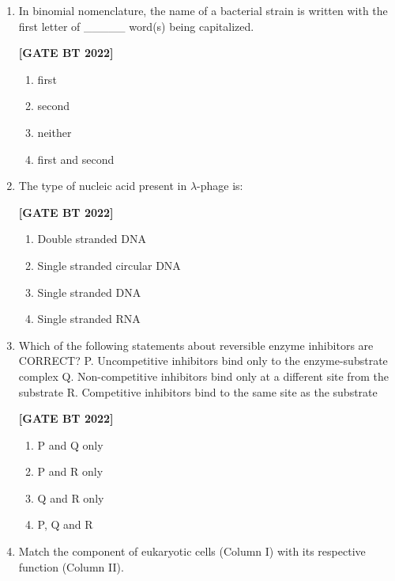 \documentclass[12pt]{article}
\begin{document}
\begin{enumerate}[leftmargin=2.5em, label=\textbf{Q.\arabic*}., itemsep=2em, resume]
\item In binomial nomenclature, the name of a bacterial strain is written with the first letter of \_\_\_\_\_ word(s) being capitalized.

\noindent \textbf{[GATE BT 2022]}
\begin{multicols}{2}
\begin{enumerate}
    \item first
    \item second
    \item neither
    \item first and second
\end{enumerate}
\end{multicols}

\item The type of nucleic acid present in $\lambda$-phage is:

\noindent \textbf{[GATE BT 2022]}
\begin{multicols}{2}
\begin{enumerate}
    \item Double stranded DNA
    \item Single stranded circular DNA
    \item Single stranded DNA
    \item Single stranded RNA
\end{enumerate}
\end{multicols}

\item Which of the following statements about reversible enzyme inhibitors are CORRECT?  
P. Uncompetitive inhibitors bind only to the enzyme-substrate complex  
Q. Non-competitive inhibitors bind only at a different site from the substrate  
R. Competitive inhibitors bind to the same site as the substrate

\noindent \textbf{[GATE BT 2022]}
\begin{multicols}{2}
\begin{enumerate}
    \item P and Q only
    \item P and R only
    \item Q and R only
    \item P, Q and R
\end{enumerate}
\end{multicols}

\item Match the component of eukaryotic cells (Column I) with its respective function (Column II).


\end{enumerate}
\end{document}
